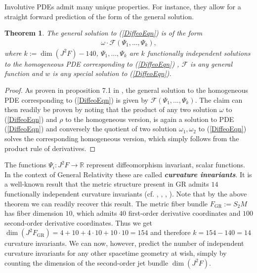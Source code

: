 \documentclass[%
preprint,
titlepage,
nofootinbib,
amsmath,amssymb,
showkeys,
aps,
prd,
floatfix,
]{revtex4-2}
\newtheorem{theorem}{Theorem}
\begin{document}
Involutive PDEs admit many unique properties. For instance, they allow for a straight forward prediction of the form of the general solution.
\begin{theorem}\label{FormalSol}
The general solution to (\ref{DiffeoEqn}) is of the form
\begin{align}
    \omega \cdot \mathcal{F} \left (\Psi_1,...,\Psi_k \right ),
\end{align}
where $k:= \operatorname{dim}(J^2F) - 140$,  $\Psi_1,...,\Psi_k$ are $k$ functionally independent solutions to the homogeneous PDE corresponding to (\ref{DiffeoEqn}) , $\mathcal{F}$ is any general function and $w$ is any special solution to (\ref{DiffeoEqn}).
\end{theorem}
\begin{proof}
As proven in proposition 7.1 in \cite{seiler1994analysis}, the general solution to the homogeneous PDE corresponding to (\ref{DiffeoEqn}) is given by $\mathcal{F} \left (\Psi_1,...,\Psi_k \right )$. The claim can then readily be proven by noting that the product of any two solution $\omega$ to (\ref{DiffeoEqn}) and $\rho$ to the homogeneous version, is again a solution to PDE (\ref{DiffeoEqn}) and conversely the quotient of two solution $\omega_1,\omega_2$ to (\ref{DiffeoEqn}) solves the corresponding homogeneous version, which simply follows from the product rule of derivatives. \end{proof}

The functions $\Psi_i: J^2F \rightarrow \mathbb{R}$ represent diffeomorphism invariant, scalar functions. In the context of General Relativity these are called \textit{\textbf{curvature invariants}}. It is a well-known result that the metric structure present in GR admits $14$ functionally independent curvature invariants (cf. \cite{2009CQGra..26b5013C}, \cite{Zakhary1997}, \cite{2002IJMPD..11..827C}, \cite{doi:10.1063/1.531425}). 
Note that by the above theorem we can readily recover this result. The metric fiber bundle $F_{\text{GR}}:=S_2M$ has fiber dimension $10$, which admits $40$ first-order derivative coordinates and $100$ second-order derivative coordinates. Thus we get $\operatorname{dim}(J^2F_{\text{GR}}) = 4+10+4\cdot10+10\cdot10 = 154$ and therefore $k=154-140=14$ curvature invariants. 
We can now, however, predict the number of independent curvature invariants for any other spacetime geometry at wish, simply by counting the dimension of the second-order jet bundle $\operatorname{dim}(J^2F)$.
\end{document}
